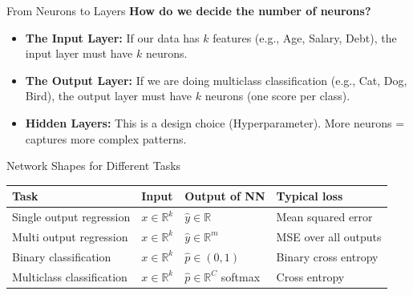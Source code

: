 \begin{frame}{From Neurons to Layers}
    \textbf{How do we decide the number of neurons?}
    
    \vspace{1em}
    \begin{itemize}
        \setlength\itemsep{1.5em}
        \item \textbf{The Input Layer:}
        If our data has $k$ features (e.g., Age, Salary, Debt), the input layer must have $k$ neurons.
        
        \item \textbf{The Output Layer:}
        If we are doing multiclass classification (e.g., Cat, Dog, Bird), the output layer must have $k$ neurons (one score per class).
        
        \item \textbf{Hidden Layers:}
        This is a design choice (Hyperparameter). More neurons = captures more complex patterns.
    \end{itemize}
\end{frame}

\begin{frame}{Network Shapes for Different Tasks}
    \centering
    \small
    \begin{tabular}{l l l l}
        \toprule
        Task 
        & Input 
        & Output of NN 
        & Typical loss \\
        \midrule
        Single output regression 
        & \(x \in \mathbb{R}^k\) 
        & \(\hat{y} \in \mathbb{R}\) 
        & Mean squared error \\
        Multi output regression 
        & \(x \in \mathbb{R}^k\) 
        & \(\hat{y} \in \mathbb{R}^m\) 
        & MSE over all outputs \\
        Binary classification 
        & \(x \in \mathbb{R}^k\) 
        & \(\hat{p} \in (0, 1)\) 
        & Binary cross entropy \\
        Multiclass classification 
        & \(x \in \mathbb{R}^k\) 
        & \(\hat{p} \in \mathbb{R}^C\) softmax 
        & Cross entropy \\
        \bottomrule
    \end{tabular}
\end{frame}

